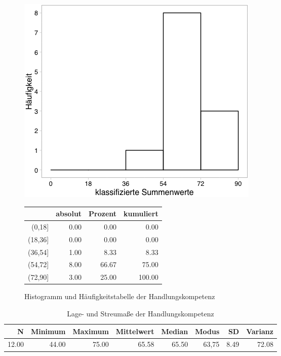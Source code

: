 \documentclass[12pt, bibliography=totoc]{scrartcl}
\begin{document}
\begin{figure}[H]
\begin{minipage}{.4\linewidth}
\includegraphics[width=0.8\linewidth]{Anhang/HKHistnn.png}

\label{pic:aufbau}
\end{minipage}
\begin{minipage}{.4\linewidth}
\centering
\raisebox{\depth}
{\begin{tabular}{rrrr}
  \hline
 & absolut & Prozent & kumuliert \\ 
  \hline
(0,18] & 0.00 & 0.00 & 0.00 \\ 
  (18,36] & 0.00 & 0.00 & 0.00 \\ 
  (36,54] & 1.00 & 8.33 & 8.33 \\ 
  (54,72] & 8.00 & 66.67 & 75.00 \\ 
  (72,90] & 3.00 & 25.00 & 100.00 \\ 
   \hline
\end{tabular}

}
\label{tab:defis}
\end{minipage}
\caption{Histogramm und Häufigkeitstabelle der Handlungskompetenz}
\label{fig:HK}
\end{figure}

\begin{table}[H]
\centering
\caption{Lage- und Streumaße der Handlungskompetenz}
\label{lHK}
\begin{tabular}{rrrrrrrr}
  \hline
  N & Minimum & Maximum & Mittelwert & Median & Modus & SD & Varianz \\
  \hline
12.00 & 44.00 & 75.00 & 65.58 & 65.50 & 63,75 & 8.49 & 72.08 \\
   \hline
\end{tabular}
\end{table}
\end{document}
